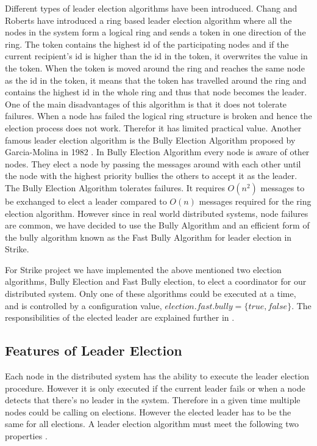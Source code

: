 \documentclass[dareport.tex]{subfiles}
\begin{document}
Different types of leader election algorithms have been introduced. Chang and Roberts have introduced a ring based leader election algorithm\cite{ChangRoberts-ringelection} where all the nodes in the system form a logical ring and sends a token in one direction of the ring. The token contains the highest id of the participating nodes and if the current recipient's id is higher than the id in the token, it overwrites the value in the token. When the token is moved around the ring and reaches the same node as the id in the token, it means that the token has travelled around the ring and contains the highest id in the whole ring and thus that node becomes the leader. One of the main disadvantages of this algorithm is that it does not tolerate failures. When a node has failed the logical ring structure is broken and hence the election process does not work. Therefor it has limited practical value. Another famous leader election algorithm is the Bully Election Algorithm proposed by Garcia-Molina in 1982 \cite{election}. In Bully Election Algorithm every node is aware of other nodes. They elect a node by passing the messages around with each other until the node with the highest priority bullies the others to accept it as the leader. The Bully Election Algorithm tolerates failures. It requires $ O(n^2) $ messages to be exchanged to elect a leader compared to $ O(n) $ messages required for the ring election algorithm. However since in real world distributed systems, node failures are common, we have decided to use the Bully Algorithm and an efficient form of the bully algorithm known as the Fast Bully Algorithm\cite{fastbully} for leader election in Strike. 

For Strike project we have implemented the above mentioned two election algorithms, Bully Election and Fast Bully election, to elect a coordinator for our distributed system. Only one of these algorithms could be executed at a time, and is controlled by a configuration value, $election.fast.bully=\{true, false\}$. The responsibilities of the elected leader are explained further in .

\subsection{Features of Leader Election}
Each node in the distributed system has the ability to execute the leader election procedure. However it is only executed if the current leader fails or when a node detects that there's no leader in the system. Therefore in a given time multiple nodes could be calling on elections. However the elected leader has to be the same for all elections. A leader election algorithm must meet the following two properties \cite{coulouris}.
\end{document}

